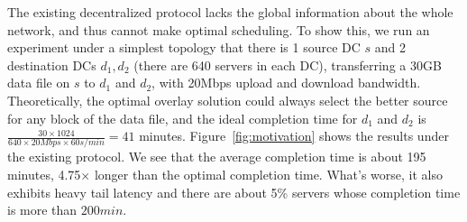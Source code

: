 %


The existing decentralized protocol lacks the global information
about the whole network, and thus cannot make optimal scheduling.
To show this, we run an experiment under a simplest topology that
there is 1 source DC $s$ and 2 destination DCs $d_1, d_2$
(there are 640 servers in each DC), transferring a 30GB data file
on $s$ to $d_1$ and $d_2$, with 20Mbps upload and download
bandwidth.
Theoretically, the optimal overlay solution could always select
the better source for any block of the data file, and the ideal
completion time for $d_1$ and $d_2$ is
$\frac{30\times 1024}{640\times 20Mbps \times 60s/min} = 41$
minutes.
Figure~\ref{fig:motivation} shows the results under the existing
protocol. We see that the average completion time is about
195 minutes, 4.75$\times$ longer than the optimal completion time.
What's worse, it also exhibits heavy tail latency and there are
about 5\% servers whose completion time is more than $200min$.


